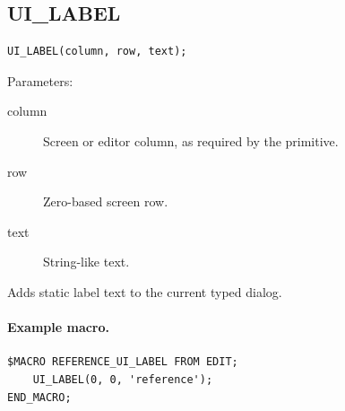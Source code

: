 \documentclass[a4paper,10pt,twoside,openany]{book}
\newenvironment{mrmacextension}{\begin{changebar}}{\end{changebar}}
\begin{document}
\begin{mrmacextension}
\label{prim:procedure-ui-label}
\subsection*{UI\_LABEL}
\begin{verbatim}
UI_LABEL(column, row, text);
\end{verbatim}
Parameters:
\begin{description}
\item[column] Screen or editor column, as required by the primitive.
\item[row] Zero-based screen row.
\item[text] String-like text.
\end{description}

Adds static label text to the current typed dialog.

\paragraph{Example macro.}
\begin{verbatim}
$MACRO REFERENCE_UI_LABEL FROM EDIT;
    UI_LABEL(0, 0, 'reference');
END_MACRO;
\end{verbatim}
\end{mrmacextension}
\end{document}
